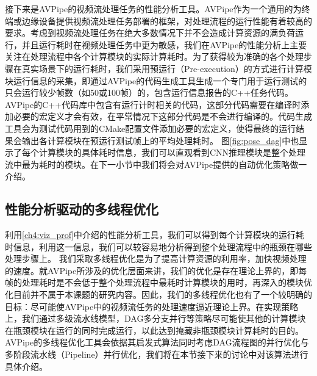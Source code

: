 接下来是AVPipe的视频流处理任务的性能分析工具。AVPipe作为一个通用的为终端或边缘设备提供视频流处理任务部署的框架，对处理流程的运行性能有着较高的要求。考虑到视频流处理任务在绝大多数情况下并不会造成计算资源的满负荷运行，并且运行耗时在视频处理任务中更为敏感，我们在AVPipe的性能分析上主要关注在处理流程中各个计算模块的实际计算耗时。为了获得较为准确的各个处理步骤在真实场景下的运行耗时，我们采用预运行（Pre-execution\cite{kim2002design}）的方式进行计算模块运行信息的采集，即通过AVPipe的代码生成工具生成一个专门用于运行测试的只会运行较少帧数（如50或100帧）的，包含运行信息报告的C++任务代码。AVPipe的C++代码库中包含有运行计时相关的代码，这部分代码需要在编译时添加必要的宏定义才会有效，在平常情况下这部分代码是不会进行编译的。代码生成工具会为测试代码用到的CMake配置文件添加必要的宏定义，使得最终的运行结果会输出各计算模块在预运行测试帧上的平均处理耗时。
图\ref{fig:pose_dag}中也显示了每个计算模块的具体耗时信息，我们可以直观看到CNN推理模块是整个处理流中最为耗时的模块。在下一小节中我们将会对AVPipe提供的自动优化策略做一介绍。


\subsection{性能分析驱动的多线程优化}
利用\ref{ch4:viz_prof}中介绍的性能分析工具，我们可以得到每个计算模块的运行耗时信息，利用这一信息，我们可以较容易地分析得到整个处理流程中的瓶颈在哪些处理步骤上。
我们采取多线程优化是为了提高计算资源的利用率，加快视频处理的速度。就AVPipe所涉及的优化层面来讲，我们的优化是存在理论上界的，即每帧的处理耗时是不会低于整个处理流程中最耗时计算模块的用时，再深入的模块优化目前并不属于本课题的研究内容。因此，我们的多线程优化也有了一个较明确的目标：尽可能使AVPipe中的视频流任务的处理速度逼近理论上界。在实现策略上，我们通过多级流水线模型，DAG多分支并行等策略尽可能使其他的计算模块在瓶颈模块在运行的同时完成运行，以此达到掩藏非瓶颈模块计算耗时的目的。
AVPipe的多线程优化工具会依据其启发式算法同时考虑DAG流程图的并行优化与多阶段流水线（Pipeline）并行优化，我们将在本节接下来的讨论中对该算法进行具体介绍。\par

